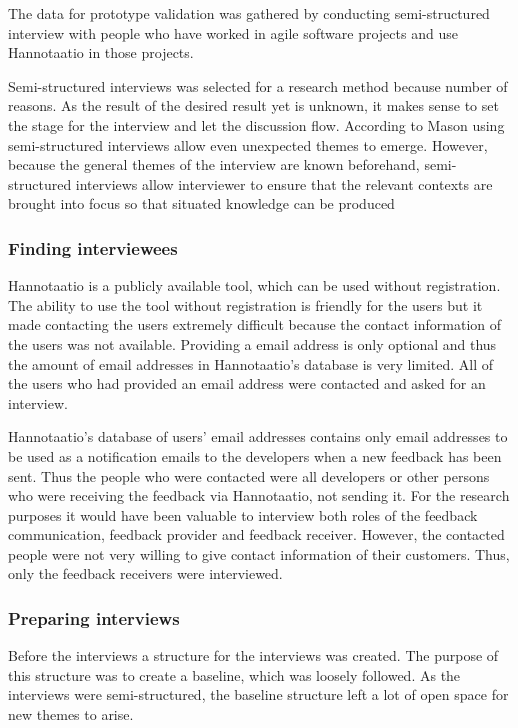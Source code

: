 \documentclass[english,12pt,a4paper,pdftex]{article}
\begin{document}
The data for prototype validation was gathered by conducting semi-structured interview with people who have worked in agile software projects and use Hannotaatio in those projects.

Semi-structured interviews was selected for a research method because number of reasons. As the result of the desired result yet is unknown, it makes sense to set the stage for the interview and let the discussion flow. According to Mason using semi-structured interviews allow even unexpected themes to emerge. However, because the general themes of the interview are known beforehand, semi-structured interviews allow interviewer to ensure that the relevant contexts are brought into focus so that situated knowledge can be produced \citep{mason2004}

\subsubsection{Finding interviewees}

Hannotaatio is a publicly available tool, which can be used without registration. The ability to use the tool without registration is friendly for the users but it made contacting the users extremely difficult because the contact information of the users was not available. Providing a email address is only optional and thus the amount of email addresses in Hannotaatio's database is very limited. All of the users who had provided an email address were contacted and asked for an interview.

Hannotaatio's database of users' email addresses contains only email addresses to be used as a notification emails to the developers when a new feedback has been sent. Thus the people who were contacted were all developers or other persons who were receiving the feedback via Hannotaatio, not sending it. For the research purposes it would have been valuable to interview both roles of the feedback communication, feedback provider and feedback receiver. However, the contacted people were not very willing to give contact information of their customers. Thus, only the feedback receivers were interviewed.

\subsubsection{Preparing interviews}

Before the interviews a structure for the interviews was created. The purpose of this structure was to create a baseline, which was loosely followed. As the interviews were semi-structured, the baseline structure left a lot of open space for new themes to arise.
\end{document}
